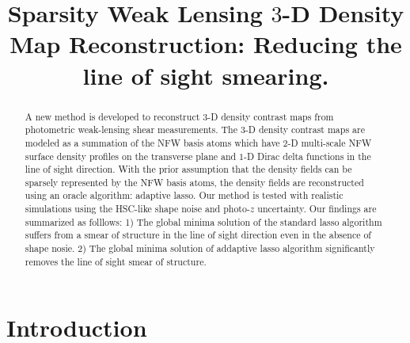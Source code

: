 \documentclass[twocolumn]{aastex62}
\begin{document}
\title{Sparsity Weak Lensing $3$-D Density Map Reconstruction:
Reducing the line of sight smearing.}

\begin{abstract}
A new method is developed to reconstruct $3$-D density contrast maps from photometric weak-lensing shear measurements.
The $3$-D density contrast maps are modeled as a summation of the NFW basis atoms which have $2$-D multi-scale NFW surface
density profiles on the transverse plane and $1$-D Dirac delta functions in the line of sight direction. With the prior
assumption that the density fields can be sparsely represented by the NFW basis atoms, the density fields are reconstructed 
using an oracle algorithm: adaptive lasso. Our method is tested with realistic simulations using the HSC-like shape noise and
photo-$z$ uncertainty.
Our findings are summarized as folllows: 1) The global minima solution of the standard lasso algorithm suffers from a
smear of structure in the line of sight direction even in the absence of shape nosie.
2) The global minima solution of addaptive lasso algorithm significantly removes the line of sight smear of structure.
\end{abstract}

\section{Introduction}
\end{document}
